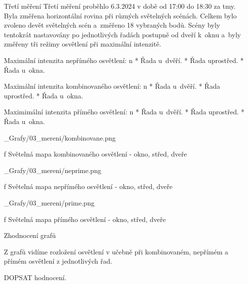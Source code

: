 \sec Třetí měření
Třetí měření proběhlo 6.3.2024 v době od 17:00 do 18:30 za tmy.
Byla změřena horizontální rovina při různých světelných scénách.
Celkem bylo zvoleno devět světelných scén a~změřeno 18 vybraných bodů.
Scény byly tentokrát nastavovány po jednotlivých
řadách postupně od dveří k~oknu a~byly změřeny tři režimy osvětlení při maximální intenzitě.\noindent

\medskip\noindent
{\sbf Maximální intenzita nepřímého osvětlení:}
\begitems \style n
    * Řada u~dvěří.
    * Řada uprostřed.
    * Řada u~okna.
\enditems

\medskip\noindent
{\sbf Maximální intenzita kombinovaného osvětlení:}
\begitems \style n
    * Řada u~dvěří.
    * Řada uprostřed.
    * Řada u~okna.
\enditems


\medskip\noindent
{\sbf Maximimální intenzita přímého osvětlení:}
\begitems \style n
    * Řada u~dvěří.
    * Řada uprostřed.
    * Řada u~okna.
\enditems

\medskip {}
\picw=18cm _Grafy/03_mereni/kombinovane.png
\caption/f Světelná mapa kombinovaného osvětlení - okno, střed, dveře
\medskip

\medskip {}
\picw=18cm _Grafy/03_mereni/neprime.png
\caption/f Světelná mapa nepřímého osvětlení - okno, střed, dveře
\medskip

\medskip {}
\picw=18cm _Grafy/03_mereni/prime.png
\caption/f Světelná mapa přímého osvětlení - okno, střed, dveře
\medskip


\medskip\noindent
{\sbf Zhodnocení grafů}

Z grafů vidíme rozložení osvětlení v učebně při kombinovaném, nepřímém a přímém osvětlení z jednotlivých řad.


DOPSAT hodnocení.\noindent





